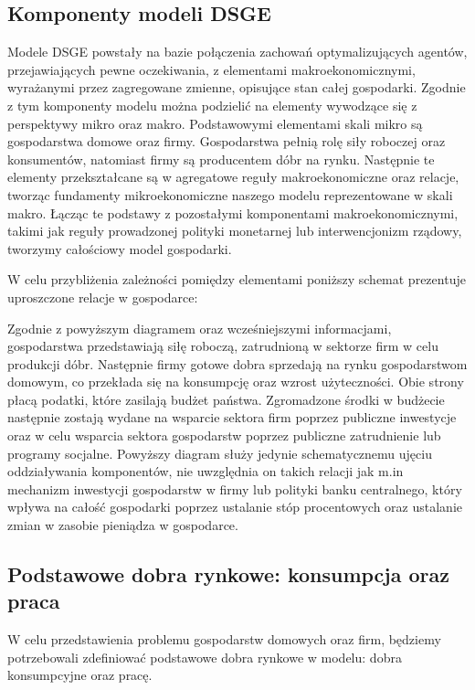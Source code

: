\subsection{Komponenty modeli DSGE}

Modele DSGE powstały na bazie połączenia zachowań optymalizujących agentów, przejawiających pewne oczekiwania, z elementami makroekonomicznymi, wyrażanymi przez zagregowane zmienne, opisujące stan całej gospodarki. Zgodnie z tym komponenty modelu można podzielić na elementy wywodzące się z perspektywy mikro oraz makro. Podstawowymi elementami skali mikro są gospodarstwa domowe oraz firmy. Gospodarstwa pełnią rolę siły roboczej oraz konsumentów, natomiast firmy są producentem dóbr na rynku. Następnie te elementy przekształcane są w agregatowe reguły makroekonomiczne oraz relacje, tworząc fundamenty mikroekonomiczne naszego modelu reprezentowane w skali makro. Łącząc te podstawy z pozostałymi komponentami makroekonomicznymi, takimi jak reguły prowadzonej polityki monetarnej lub interwencjonizm rządowy, tworzymy całościowy model gospodarki.

W celu przybliżenia zależności pomiędzy elementami poniższy schemat prezentuje uproszczone relacje w gospodarce:
\begin{center}
    
\end{center}
Zgodnie z powyższym diagramem oraz wcześniejszymi informacjami, gospodarstwa przedstawiają siłę roboczą, zatrudnioną w sektorze firm w celu produkcji dóbr. Następnie firmy gotowe dobra sprzedają na rynku gospodarstwom domowym, co przekłada się na konsumpcję oraz wzrost użyteczności. Obie strony płacą podatki, które zasilają budżet państwa. Zgromadzone środki w budżecie następnie zostają wydane na wsparcie sektora firm poprzez publiczne inwestycje oraz w celu wsparcia sektora gospodarstw poprzez publiczne zatrudnienie lub programy socjalne. Powyższy diagram służy jedynie schematycznemu ujęciu oddziaływania komponentów, nie uwzględnia on takich relacji jak m.in mechanizm inwestycji gospodarstw w firmy lub polityki banku centralnego, który wpływa na całość gospodarki poprzez ustalanie stóp procentowych oraz ustalanie zmian w zasobie pieniądza w gospodarce.

\subsection{Podstawowe dobra rynkowe: konsumpcja oraz praca}

W celu przedstawienia problemu gospodarstw domowych oraz firm, będziemy potrzebowali zdefiniować podstawowe dobra rynkowe w modelu: dobra konsumpcyjne oraz pracę.

